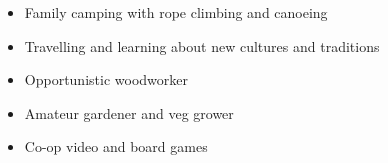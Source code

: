 \documentclass[10pt,a4paper,ragged2e,withhyper]{altacv}
\begin{document}
\begin{paracol}{2}



\divider


\begin{itemize}
    \item Family camping with rope climbing and canoeing
    
    \item Travelling and learning about new cultures and traditions

    \item Opportunistic woodworker

    \item Amateur gardener and veg grower

    \item Co-op video and board games
\end{itemize}


\end{paracol}

\end{document}
